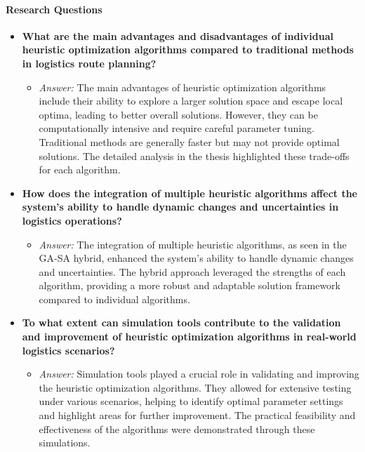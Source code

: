 \documentclass{article}
\begin{document}
    \paragraph{Research Questions}
    \begin{itemize}
        \item \textbf{What are the main advantages and disadvantages of individual heuristic optimization algorithms compared to traditional methods in logistics route planning?}
        \begin{itemize}
            \item \textit{Answer:} The main advantages of heuristic optimization algorithms include their ability to explore a larger solution space and escape local optima, leading to better overall solutions. However, they can be computationally intensive and require careful parameter tuning. Traditional methods are generally faster but may not provide optimal solutions. The detailed analysis in the thesis highlighted these trade-offs for each algorithm.
        \end{itemize}
        \item \textbf{How does the integration of multiple heuristic algorithms affect the system's ability to handle dynamic changes and uncertainties in logistics operations?}
        \begin{itemize}
            \item \textit{Answer:} The integration of multiple heuristic algorithms, as seen in the GA-SA hybrid, enhanced the system's ability to handle dynamic changes and uncertainties. The hybrid approach leveraged the strengths of each algorithm, providing a more robust and adaptable solution framework compared to individual algorithms.
        \end{itemize}
        \item \textbf{To what extent can simulation tools contribute to the validation and improvement of heuristic optimization algorithms in real-world logistics scenarios?}
        \begin{itemize}
            \item \textit{Answer:} Simulation tools played a crucial role in validating and improving the heuristic optimization algorithms. They allowed for extensive testing under various scenarios, helping to identify optimal parameter settings and highlight areas for further improvement. The practical feasibility and effectiveness of the algorithms were demonstrated through these simulations.
        \end{itemize}

    \end{itemize}
\end{document}
